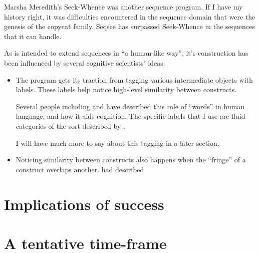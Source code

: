 \documentclass{article}
\begin{document}
Marsha Meredith's Seek-Whence \cite{Meredith} was another sequence program. If I have my history right, it was difficulties encountered in the sequence domain that were the genesis of the copycat family. Seqsee has surpassed Seek-Whence in the sequences that it can handle.

As \seq is intended to extend sequences in ``a human-like way'', it's construction has been influenced by several cognitive scientists' ideas:

\begin{itemize}
\item The program gets its traction from tagging various intermediate objects with labels. These labels help \seq notice high-level similarity between constructs.

Several people including \dan and \andy have described this role of ``words'' in human language, and how it aids cognition. The specific labels that I use are fluid categories of the sort described by \hof.

I will have much more to say about this tagging in a later section.

\item Noticing similarity between constructs also happens when the ``fringe'' of a construct overlaps another. \cite{James} had described 
\end{itemize}




\section{Implications of success}
\section{A tentative time-frame}


\printindex
\end{document}
